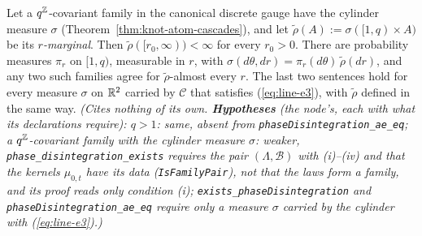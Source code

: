 \begin{lemma}
\label{lem:phase-disintegration-exists}
\leanok
{}
Let a $q^{\mathbb{Z}}$-covariant family in the canonical discrete gauge have the cylinder measure $\sigma$
(Theorem~\ref{thm:knot-atom-cascades}), and let $\tilde\rho(A) := \sigma([1,q) \times A)$ be its
\emph{$r$-marginal}. Then $\tilde\rho([r_0,\infty)) < \infty$ for every $r_0 > 0$.
There are probability measures $\pi_r$ on $[1,q)$, measurable in $r$, with
$\sigma(d\theta, dr) = \pi_r(d\theta)\,\tilde\rho(dr)$, and any two such families agree for
$\tilde\rho$-almost every $r$. The last two sentences hold for every measure $\sigma$ on $\mathbb{R}^2$
carried by $\mathcal{C}$ that satisfies (\ref{eq:line-e3}), with $\tilde\rho$ defined in the same way.
\statusT\quad\emph{(Cites nothing of its own. \textbf{Hypotheses} (the node's, each with what its
declarations require): $q > 1$: same, absent from \texttt{phaseDisintegration\_ae\_eq}; a
$q^{\mathbb{Z}}$-covariant family with the cylinder measure $\sigma$: weaker,
\texttt{phase\_disintegration\_exists} requires the pair $(\Lambda, \mathcal{B})$ with (i)--(iv) and
that the kernels $\mu_{0,t}$ have its data (\texttt{IsFamilyPair}), not that the laws form a family,
and its proof reads only condition (i); \texttt{exists\_phaseDisintegration} and
\texttt{phaseDisintegration\_ae\_eq} require only a measure $\sigma$ carried by the cylinder with
(\ref{eq:line-e3}).)}
\end{lemma}

